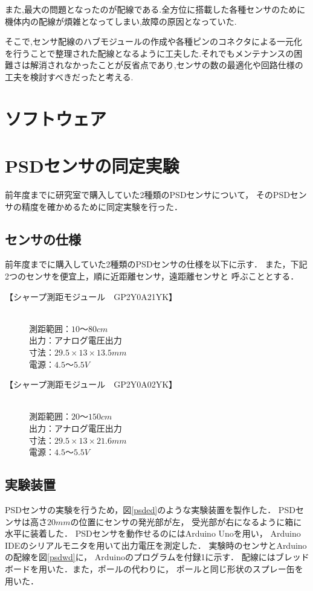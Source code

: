 \documentclass[11pt,a4]{jsarticle}
\begin{document}
また,最大の問題となったのが配線である.全方位に搭載した各種センサのために機体内の配線が煩雑となってしまい,故障の原因となっていた.

そこで,センサ配線のハブモジュールの作成や各種ピンのコネクタによる一元化を行うことで整理された配線となるように工夫した.それでもメンテナンスの困難さは解消されなかったことが反省点であり,センサの数の最適化や回路仕様の工夫を検討すべきだったと考える.


\section{ソフトウェア}

\section{PSDセンサの同定実験}
\label{psdex}

前年度までに研究室で購入していた2種類のPSDセンサについて，
そのPSDセンサの精度を確かめるために同定実験を行った．

\subsection{センサの仕様}
前年度までに購入していた2種類のPSDセンサの仕様を以下に示す．
また，下記2つのセンサを便宜上，順に近距離センサ，遠距離センサと
呼ぶこととする．\\

 \begin{description}
  \item[【シャープ測距モジュール　GP2Y0A21YK】] \mbox{} \\
	     測距範囲：$10〜80\unit{cm}$ \\
	     出力：アナログ電圧出力 \\
	     寸法：$29.5×13×13.5\unit{mm}$ \\
	     電源：$4.5〜5.5\unit{V}$
  \item[【シャープ測距モジュール　GP2Y0A02YK】] \mbox{} \\
	     測距範囲：$20〜150\unit{cm}$ \\
	     出力：アナログ電圧出力 \\
	     寸法：$29.5×13×21.6\unit{mm}$ \\
	     電源：$4.5〜5.5\unit{V}$
 \end{description}


\subsection{実験装置}
PSDセンサの実験を行うため，図\ref{psded}のような実験装置を製作した．
PSDセンサは高さ$20\unit{mm}$の位置にセンサの発光部が左，
受光部が右になるように箱に水平に装着した．
PSDセンサを動作せるのにはArduino Unoを用い，
Arduino IDEのシリアルモニタを用いて出力電圧を測定した．
実験時のセンサとArduinoの配線を図\ref{psdwd}に，
Arduinoのプログラムを付録1に示す．
配線にはブレッドボードを用いた．また，ポールの代わりに，
ポールと同じ形状のスプレー缶を用いた．
\end{document}
